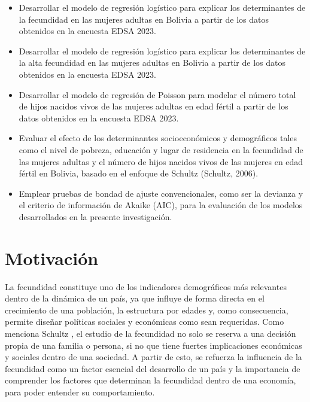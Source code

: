 \documentclass[Royal,times,sageh]{sagej}
\begin{document}
\begin{itemize}
\item
  Desarrollar el modelo de regresión logístico para explicar los
  determinantes de la fecundidad en las mujeres adultas en Bolivia a
  partir de los datos obtenidos en la encuesta EDSA 2023.
\item
  Desarrollar el modelo de regresión logístico para explicar los
  determinantes de la alta fecundidad en las mujeres adultas en Bolivia
  a partir de los datos obtenidos en la encuesta EDSA 2023.
\item
  Desarrollar el modelo de regresión de Poisson para modelar el número
  total de hijos nacidos vivos de las mujeres adultas en edad fértil a
  partir de los datos obtenidos en la encuesta EDSA 2023.
\item
  Evaluar el efecto de los determinantes socioeconómicos y demográficos
  tales como el nivel de pobreza, educación y lugar de residencia en la
  fecundidad de las mujeres adultas y el número de hijos nacidos vivos
  de las mujeres en edad fértil en Bolivia, basado en el enfoque de
  Schultz (Schultz, 2006).
\item
  Emplear pruebas de bondad de ajuste convencionales, como ser la
  devianza y el criterio de información de Akaike (AIC), para la
  evaluación de los modelos desarrollados en la presente investigación.
\end{itemize}

\section{Motivación}\label{motivaciuxf3n}

La fecundidad constituye uno de los indicadores demográficos más
relevantes dentro de la dinámica de un país, ya que influye de forma
directa en el crecimiento de una población, la estructura por edades y,
como consecuencia, permite diseñar políticas sociales y económicas como
sean requeridas. Como menciona Schultz \citep{schultz2006fertility}, el
estudio de la fecundidad no solo se reserva a una decisión propia de una
familia o persona, si no que tiene fuertes implicaciones económicas y
sociales dentro de una sociedad. A partir de esto, se refuerza la
influencia de la fecundidad como un factor esencial del desarrollo de un
país y la importancia de comprender los factores que determinan la
fecundidad dentro de una economía, para poder entender su
comportamiento.
\end{document}
